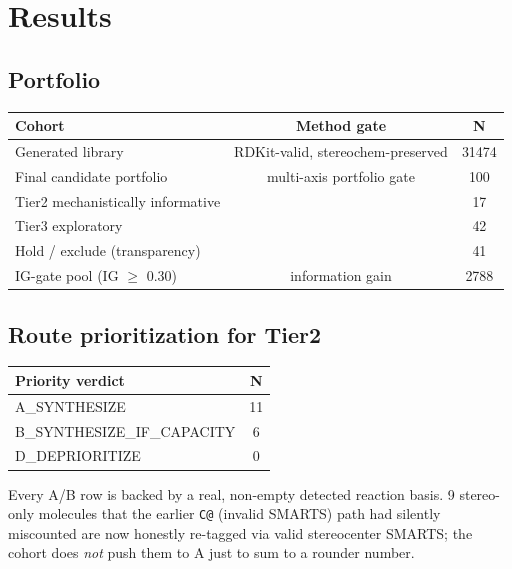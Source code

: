 \documentclass[11pt]{article}
\begin{document}
\section{Results}
\subsection{Portfolio}
\begin{center}
\begin{tabular}{lcc} \toprule
Cohort & Method gate & N \\ \midrule
Generated library & RDKit-valid, stereochem-preserved &
31474 \\
Final candidate portfolio & multi-axis portfolio gate & 100 \\
\quad Tier2 mechanistically informative & & 17 \\
\quad Tier3 exploratory & & 42 \\
\quad Hold / exclude (transparency) & & 41 \\
IG-gate pool (IG $\ge$ 0.30) & information gain & 2788 \\
\bottomrule
\end{tabular}
\end{center}

\subsection{Route prioritization for Tier2}
\begin{center}
\begin{tabular}{lc} \toprule
Priority verdict & N \\ \midrule
A\_SYNTHESIZE & 11 \\
B\_SYNTHESIZE\_IF\_CAPACITY & 6 \\
D\_DEPRIORITIZE & 0 \\
\bottomrule
\end{tabular}
\end{center}
Every A/B row is backed by a real, non-empty detected reaction basis.
9 stereo-only molecules that the earlier \texttt{C@} (invalid SMARTS)
path had silently miscounted are now honestly re-tagged via valid
stereocenter SMARTS; the cohort does \emph{not} push them to A just to
sum to a rounder number.
\end{document}
